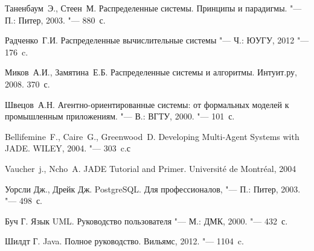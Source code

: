 \begin{thebibliography}{99}
\bibitem{} Таненбаум~Э., Стеен~М. Распределенные системы. Принципы и парадигмы. "---П.:
Питер, 2003. "--- 880~с.

\bibitem{} Радченко~Г.И. Распределенные вычислительные системы "--- Ч.:
ЮУГУ, 2012 "--- 176~c.

\bibitem{} Миков~А.И., Замятина~Е.Б. Распределенные системы и алгоритмы. Интуит.ру, 2008. 370~с.

\bibitem{} Швецов~А.Н. Агентно-ориентированные системы: от формальных моделей к промышленным приложениям. "--- В.:
ВГТУ, 2000. "--- 101~с.

\bibitem{} Bellifemine~F., Caire~G., Greenwood~D. Developing Multi-Agent Systems with JADE. WILEY, 2004. "--- 303~c.с

\bibitem{} Vaucher~j., Ncho~A. JADE Tutorial and Primer. Université de Montréal, 2004 

\bibitem{} Уорсли Дж., Дрейк Дж. PostgreSQL. Для профессионалов, "--- П.:
Питер, 2003. "--- 498~с.

\bibitem{} Буч Г. Язык UML. Руководство пользователя "--- М.: ДМК, 2000. "--- 432~с.

\bibitem{} Шилдт Г. Java. Полное руководство. Вильямс, 2012. "--- 1104~c.
\end{thebibliography}
